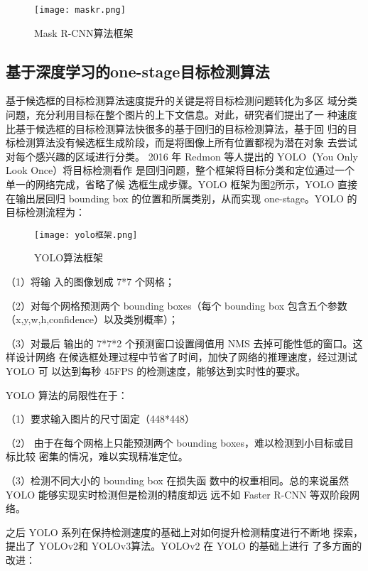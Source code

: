 \begin{figure}[htbp]
    \centering
    \texttt{[image: maskr.png]}
    \caption{Mask R-CNN算法框架}
    \label{maskr}
\end{figure}

\subsection{基于深度学习的one-stage目标检测算法}
基于候选框的目标检测算法速度提升的关键是将目标检测问题转化为多区
域分类问题，充分利用目标在整个图片的上下文信息。对此，研究者们提出了一
种速度比基于候选框的目标检测算法快很多的基于回归的目标检测算法，基于回
归的目标检测算法没有候选框生成阶段，而是将图像上所有位置都视为潜在对象
去尝试对每个感兴趣的区域进行分类\cite{jiao2019survey,wu2020recent}。
2016 年 Redmon 等人提出的 YOLO（You Only Look Once）将目标检测看作
是回归问题\cite{redmon2016you}，整个框架将目标分类和定位通过一个单一的网络完成，省略了候
选框生成步骤。YOLO 框架为图\ref{yk}所示，YOLO 直接在输出层回归 bounding box
的位置和所属类别，从而实现 one-stage。YOLO 的目标检测流程为：

\begin{figure}[htbp]
    \centering
    \texttt{[image: yolo框架.png]}
    \caption{YOLO算法框架}
    \label{yk}
\end{figure}

（1）将输
入的图像划成 7*7 个网格；

（2）对每个网格预测两个 bounding boxes（每个
bounding box 包含五个参数（x,y,w,h,confidence）以及类别概率）；

（3）对最后
输出的 7*7*2 个预测窗口设置阈值用 NMS 去掉可能性低的窗口。这样设计网络
在候选框处理过程中节省了时间，加快了网络的推理速度，经过测试 YOLO 可
以达到每秒 45FPS 的检测速度，能够达到实时性的要求。

YOLO 算法的局限性在于：

（1）要求输入图片的尺寸固定（448*448）

（2）
由于在每个网格上只能预测两个 bounding boxes，难以检测到小目标或目标比较
密集的情况，难以实现精准定位。

（3）检测不同大小的 bounding box 在损失函
数中的权重相同。总的来说虽然 YOLO 能够实现实时检测但是检测的精度却远
远不如 Faster R-CNN 等双阶段网络。

之后 YOLO 系列在保持检测速度的基础上对如何提升检测精度进行不断地
探索，提出了 YOLOv2\cite{redmon2017yolo9000}和 YOLOv3\cite{redmon2018yolov3}算法。YOLOv2 在 YOLO 的基础上进行
了多方面的改进：

